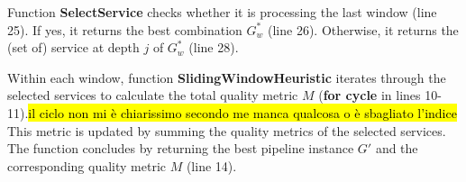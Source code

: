 Function \textbf{SelectService} checks whether it is processing the last window (line 25). If yes, it returns the best combination $G^*_w$ (line 26). Otherwise, it returns the (set of) service at depth $j$ of $G^*_w$ (line 28).

Within each window, function \textbf{SlidingWindowHeuristic} iterates through the selected services to calculate the total quality metric $M$ (\textbf{for cycle} in lines 10-11).\hl{il ciclo non mi è chiarissimo secondo me manca qualcosa o è sbagliato l'indice} This metric is updated by summing the quality metrics of the selected services. The function concludes by returning the best pipeline instance $G'$ and the corresponding quality metric $M$ (line 14).


